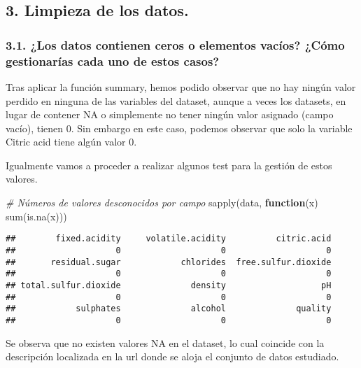 \documentclass[
]{article}
\newenvironment{Shaded}{\begin{snugshade}}{\end{snugshade}}
\newcommand{\CommentTok}[1]{\textcolor[rgb]{0.56,0.35,0.01}{\textit{#1}}}
\newcommand{\ControlFlowTok}[1]{\textcolor[rgb]{0.13,0.29,0.53}{\textbf{#1}}}
\newcommand{\FunctionTok}[1]{\textcolor[rgb]{0.00,0.00,0.00}{#1}}
\newcommand{\NormalTok}[1]{#1}
\begin{document}
\hypertarget{limpieza-de-los-datos.}{%
\subsection{3. Limpieza de los datos.}\label{limpieza-de-los-datos.}}

\hypertarget{los-datos-contienen-ceros-o-elementos-vacuxedos-cuxf3mo-gestionaruxedas-cada-uno-de-estos-casos}{%
\subsubsection{3.1. ¿Los datos contienen ceros o elementos vacíos? ¿Cómo
gestionarías cada uno de estos
casos?}\label{los-datos-contienen-ceros-o-elementos-vacuxedos-cuxf3mo-gestionaruxedas-cada-uno-de-estos-casos}}

Tras aplicar la función summary, hemos podido observar que no hay ningún
valor perdido en ninguna de las variables del dataset, aunque a veces
los datasets, en lugar de contener NA o simplemente no tener ningún
valor asignado (campo vacío), tienen 0. Sin embargo en este caso,
podemos observar que solo la variable Citric acid tiene algún valor 0.

Igualmente vamos a proceder a realizar algunos test para la gestión de
estos valores.

\begin{Shaded}
\begin{Highlighting}[]
\CommentTok{\# Números de valores desconocidos por campo}
\FunctionTok{sapply}\NormalTok{(data, }\ControlFlowTok{function}\NormalTok{(x) }\FunctionTok{sum}\NormalTok{(}\FunctionTok{is.na}\NormalTok{(x)))}
\end{Highlighting}
\end{Shaded}

\begin{verbatim}
##        fixed.acidity     volatile.acidity          citric.acid 
##                    0                    0                    0 
##       residual.sugar            chlorides  free.sulfur.dioxide 
##                    0                    0                    0 
## total.sulfur.dioxide              density                   pH 
##                    0                    0                    0 
##            sulphates              alcohol              quality 
##                    0                    0                    0
\end{verbatim}

Se observa que no existen valores NA en el dataset, lo cual coincide con
la descripción localizada en la url donde se aloja el conjunto de datos
estudiado.
\end{document}
